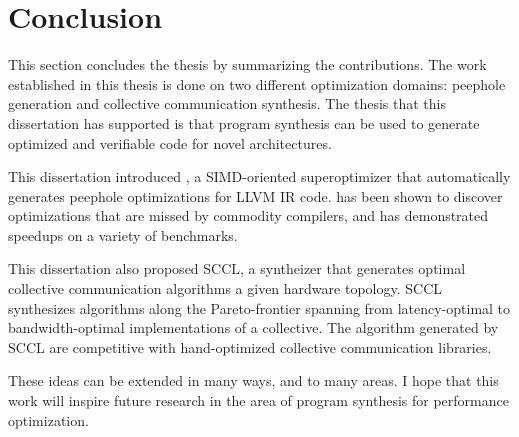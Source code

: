 \chapter{Conclusion}
\label{chap:conclusion}

This section concludes the thesis by summarizing the contributions.
%
The work established in this thesis is done on two different optimization
domains: peephole generation and collective communication synthesis.
%
The thesis that this dissertation has supported is that program synthesis can
be used to generate optimized and verifiable code for novel architectures.


This dissertation introduced \minotaur{}, a SIMD-oriented
superoptimizer that automatically
 generates peephole optimizations for LLVM IR code.
%
\minotaur{} has been shown to discover optimizations that are missed by
commodity compilers, and has demonstrated speedups on a variety of
benchmarks.

This dissertation also proposed SCCL, a syntheizer that generates
optimal collective communication algorithms a given hardware topology.
%
SCCL synthesizes algorithms along the Pareto-frontier spanning from
latency-optimal to bandwidth-optimal implementations of a collective.
%
The algorithm generated by SCCL are competitive with hand-optimized
collective communication libraries.


These ideas can be extended in many ways, and to many areas. I hope
that this work will inspire future research in the area of program
synthesis for performance optimization.
